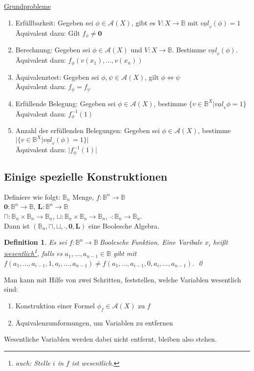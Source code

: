 \documentclass[ngerman]{scrartcl}
\theoremstyle{custom}
\newtheorem{mdef}{Definition} \numberwithin{mdef}{subsection}
\newcommand{\ax}{\mathcal{A}(X)}
\newcommand{\val}{\underline{val}_v}
\newcommand{\0}{\mathbf{0}}
\newcommand{\1}{\mathbf{L}}
\newcommand{\bel}{$V: X \rightarrow \mathds{B}$}
\newcommand{\bol}{\mathds{B}^n \rightarrow \mathds{B}}
\newcommand{\bolf}{$f: \bol~$}
\begin{document}
\underline{Grundprobleme}
\begin{enumerate}
\item Erf\"ullbarkeit: Gegeben sei $\phi \in \ax$, gibt es $V: X
  \rightarrow \mathds{B}$ mit $\val(\phi) = 1$\\
\"Aquivalent dazu: Gilt $f_{\phi} \not = \0$
\item Berechnung: Gegeben sei $\phi \in \ax$ und \bel. Bestimme
  $\val(\phi)$.\\
\"Aquivalent dazu: $f_{\phi}(v(x_1), \dots, v(x_n))$
\item \"Aquivalenztest: Gegeben sei $\phi, \psi \in \ax$, gilt $\phi
  \Leftrightarrow \psi$\\
\"Aquivalent dazu: $f_{\phi} = f_{\psi}$
\item Erf\"ullende Belegung: Gegeben sei $\phi \in \ax$, bestimme $\{v
  \in \mathds{B}^X \vert \val{\phi} = 1\}$\\
\"Aquivalent dazu: $f_{\phi}^{-1}(1)$
\item Anzahl der erf\"ullenden Belegungen: Gegeben sei $\phi \in \ax$,
  bestimme $\vert \{v \in \mathds{B}^X \vert \val(\phi) = 1\}
  \vert$\\
\"Aquivalent dazu: $\vert f_{\phi}^{-1}(1) \vert$
\end{enumerate}

\subsection{Einige spezielle Konstruktionen}
Definiere wie folgt: $\mathds{B}_n$ Menge, $f: \mathds{B}^n \rightarrow \mathds{B}$\\
$\0: \bol$, $\1: \bol$\\
$\sqcap: \mathds{B}_n \times \mathds{B}_n \rightarrow \mathds{B}_n$,
$\sqcup: \mathds{B}_n \times \mathds{B}_n \rightarrow \mathds{B}_n$,
$\bar ~: \mathds{B}_n \rightarrow \mathds{B}_n$.\\
Dann ist $(\mathds{B}_n, \sqcap, \sqcup, \bar ~, \0, \1)$ eine
Boolesche Algebra.

\begin{mdef}
Es sei \bolf Boolesche Funktion. Eine Varibale $x_i$ hei\ss t
\underline{wesentlich}\footnote{auch: Stelle $i$ in $f$ ist wesentlich.}, falls es $a_1, \dots, a_{n-1} \in \mathds{B}$
gibt mit $f(a_1, \dots, a_{i-1}, 1, a_i, \dots, a_{n-1}) \not = f(a_1,
\dots, a_{i-1}, 0, a_i, \dots, a_{n-1})$.
\qed
\end{mdef}

Man kann mit Hilfe von zwei Schritten, feststellen, welche Variablen
wesentlich sind:
\begin{enumerate}
\item Konstruktion einer Formel $\phi_f \in \ax$ zu $f$
\item \"Aquivalenzumformungen, um Variablen zu entfernen
\end{enumerate}
Wesentliche Variablen werden dabei nicht entfernt, bleiben also
stehen.
\end{document}
